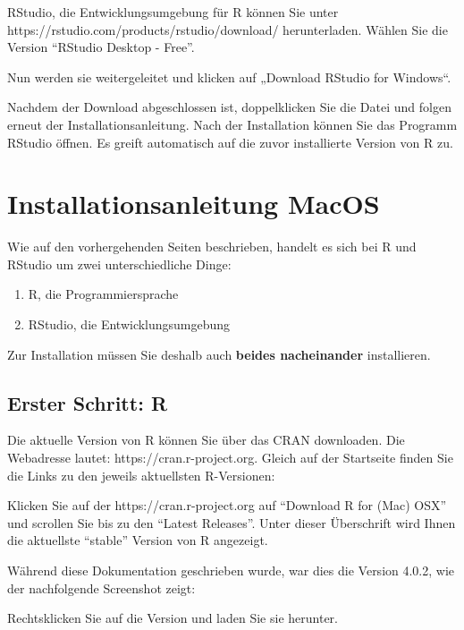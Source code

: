 \documentclass[
]{book}
\begin{document}
RStudio, die Entwicklungsumgebung für R können Sie unter https://rstudio.com/products/rstudio/download/ herunterladen.
Wählen Sie die Version ``RStudio Desktop - Free''.

Nun werden sie weitergeleitet und klicken auf „Download RStudio for Windows``.

Nachdem der Download abgeschlossen ist, doppelklicken Sie die Datei und folgen erneut der Installationsanleitung. Nach der Installation können Sie das Programm RStudio öffnen. Es greift automatisch auf die zuvor installierte Version von R zu.

\hypertarget{installationsanleitung-macos}{%
\section{Installationsanleitung MacOS}\label{installationsanleitung-macos}}

Wie auf den vorhergehenden Seiten beschrieben, handelt es sich bei R und RStudio um zwei unterschiedliche Dinge:

\begin{enumerate}
\def\labelenumi{\arabic{enumi}.}
\item
  R, die Programmiersprache
\item
  RStudio, die Entwicklungsumgebung
\end{enumerate}

Zur Installation müssen Sie deshalb auch \textbf{beides nacheinander} installieren.

\hypertarget{erster-schritt-r-1}{%
\subsection{Erster Schritt: R}\label{erster-schritt-r-1}}

Die aktuelle Version von R können Sie über das CRAN downloaden. Die Webadresse lautet: https://cran.r-project.org. Gleich auf der Startseite finden Sie die Links zu den jeweils aktuellsten R-Versionen:

Klicken Sie auf der https://cran.r-project.org auf ``Download R for (Mac) OSX'' und scrollen Sie bis zu den ``Latest Releases''. Unter dieser Überschrift wird Ihnen die aktuellste ``stable'' Version von R angezeigt.

Während diese Dokumentation geschrieben wurde, war dies die Version 4.0.2, wie der nachfolgende Screenshot zeigt:

Rechtsklicken Sie auf die Version und laden Sie sie herunter.
\end{document}
